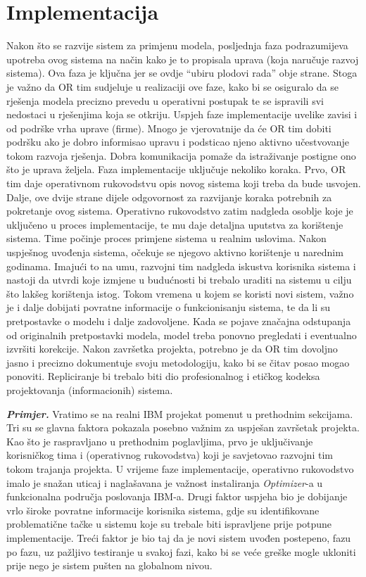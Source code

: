 \documentclass[a4paper, utf8, 11pt, colorlinks]{book}
\begin{document}
\section{Implementacija}
Nakon što se razvije sistem za primjenu modela, posljednja faza  podrazumijeva upotreba ovog sistema  na način kako je to propisala uprava (koja naručuje razvoj sistema). Ova faza je ključna jer se ovdje ``ubiru plodovi rada'' obje strane. Stoga je važno da OR tim  sudjeluje u  realizaciji ove faze, kako bi se osiguralo da se rješenja modela precizno prevedu u operativni postupak te se ispravili svi nedostaci u rješenjima koja se otkriju. Uspjeh faze implementacije uvelike zavisi i od podrške vrha uprave (firme). Mnogo je vjerovatnije da će OR tim dobiti podršku ako je dobro informisao upravu i podsticao  njeno aktivno učestvovanje tokom razvoja rješenja. Dobra komunikacija pomaže da istraživanje postigne ono što je uprava željela.  Faza implementacije uključuje nekoliko koraka. Prvo, OR tim daje operativnom rukovodstvu opis novog sistema koji treba da bude usvojen. Dalje, ove dvije strane dijele odgovornost za razvijanje koraka potrebnih za pokretanje ovog sistema. Operativno rukovodstvo zatim nadgleda  osoblje koje je uključeno u proces implementacije, te mu daje detaljna uputstva za korištenje sistema. Time počinje proces primjene sistema u realnim uslovima. Nakon uspješnog uvođenja sistema, očekuje se njegovo aktivno korištenje u narednim godinama. Imajući to na umu, razvojni tim nadgleda iskustva korisnika sistema i nastoji da utvrdi koje izmjene u budućnosti bi trebalo uraditi na sistemu  u cilju što lakšeg korištenja istog.  Tokom vremena u kojem se koristi novi sistem, važno je i dalje dobijati povratne informacije o funkcionisanju sistema, te da li su pretpostavke o modelu i dalje zadovoljene. Kada se pojave značajna odstupanja od originalnih pretpostavki modela, model treba ponovno pregledati i eventualno izvršiti korekcije. Nakon završetka projekta, potrebno je da OR tim  dovoljno jasno i precizno dokumentuje svoju metodologiju, kako bi se čitav posao mogao ponoviti. Repliciranje bi trebalo
biti dio profesionalnog i etičkog kodeksa projektovanja (informacionih) sistema. %

\textbf{\emph{Primjer.}} Vratimo se na realni  IBM projekat pomenut u prethodnim sekcijama.  Tri su se glavna faktora pokazala posebno važnim za uspješan završetak projekta. Kao što je raspravljano u prethodnim poglavljima, 
prvo je   uključivanje korisničkog tima i (operativnog rukovodstva) koji je savjetovao razvojni tim tokom trajanja   projekta. U vrijeme faze implementacije, operativno rukovodstvo imalo je snažan  uticaj i naglašavana je važnost instaliranja \emph{Optimizer}-a u  funkcionalna područja poslovanja IBM-a. Drugi faktor uspjeha bio je dobijanje vrlo široke povratne informacije korisnika sistema, gdje su identifikovane problematične tačke u sistemu koje su  trebale biti ispravljene prije potpune implementacije. 
Treći faktor je bio taj da je novi sistem  uvođen postepeno, fazu po fazu, uz pažljivo testiranje u svakoj fazi, kako bi se veće greške mogle ukloniti prije nego   je sistem   pušten na  globalnom nivou.  
\vspace{0.5cm}
\end{document}
